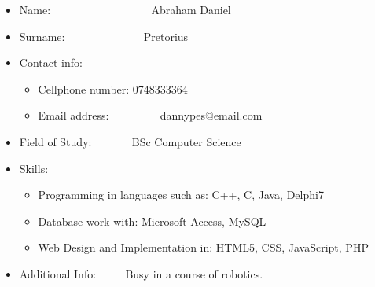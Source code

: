 \documentclass[12pt]{article}
\begin{document}
\begin{itemize}
	\item Name: \ ~~~~~~~~~~~~~~~ \ Abraham Daniel
	\item Surname: \ ~~~~~~~~~~~ \  Pretorius
	\item Contact info: \ ~~~~~~ \  
		\begin{itemize}
					\item Cellphone number: 0748333364 
					\item Email address: \ ~~~~~~ \ dannypes@email.com
		\end{itemize}

	
	\item Field of Study: \ ~~~~ \ BSc Computer Science 
	\item Skills: \begin{itemize}
					\item Programming in languages such as: C++, C, Java, Delphi7 
					\item Database work with: Microsoft Access, MySQL
					\item Web Design and Implementation in: HTML5, CSS, JavaScript, PHP   
				  \end{itemize}
	\item Additional Info: \ ~~ \ Busy in a course of robotics. 
	
\end{itemize}
\end{document}
